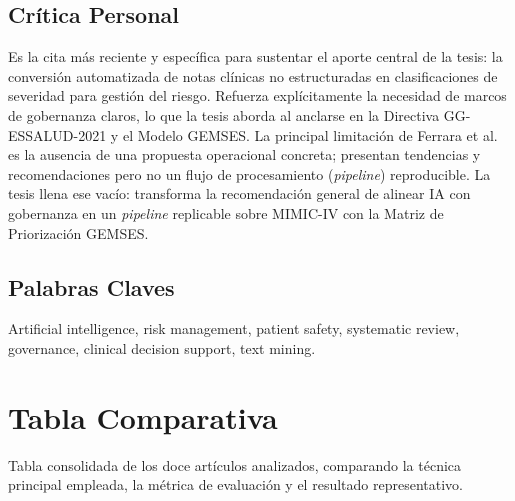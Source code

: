 \documentclass[11pt,a4paper]{article}
\begin{document}
\subsection{Crítica Personal}
Es la cita más reciente y específica para sustentar el aporte central de la tesis: la conversión automatizada de notas clínicas no estructuradas en clasificaciones de severidad para gestión del riesgo. Refuerza explícitamente la necesidad de marcos de gobernanza claros, lo que la tesis aborda al anclarse en la Directiva GG-ESSALUD-2021 y el Modelo GEMSES. La principal limitación de Ferrara et al. es la ausencia de una propuesta operacional concreta; presentan tendencias y recomendaciones pero no un flujo de procesamiento (\textit{pipeline}) reproducible. La tesis llena ese vacío: transforma la recomendación general de alinear IA con gobernanza en un \textit{pipeline} replicable sobre MIMIC-IV con la Matriz de Priorización GEMSES.

\subsection{Palabras Claves}
Artificial intelligence, risk management, patient safety, systematic review, governance, clinical decision support, text mining.

\newpage

\section{Tabla Comparativa}

Tabla consolidada de los doce artículos analizados, comparando la técnica principal empleada, la métrica de evaluación y el resultado representativo.
\end{document}
